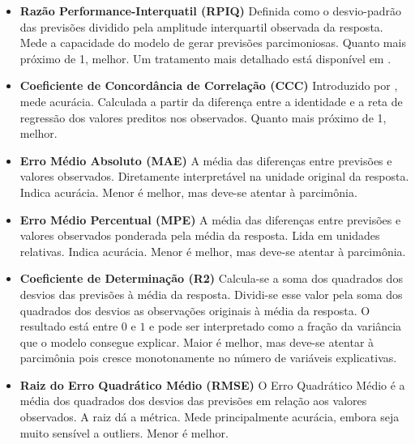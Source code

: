 \begin{itemize}
    \item \textbf{Razão Performance-Interquatil (RPIQ)} \newline
    Definida como o desvio-padrão das previsões dividido pela amplitude interquartil observada da resposta. Mede a capacidade do modelo de gerar previsões parcimoniosas. Quanto mais próximo de 1, melhor. Um tratamento mais detalhado está disponível em .
    
    \item \textbf{Coeficiente de Concordância de Correlação (CCC)} \newline
    Introduzido por , mede acurácia. Calculada a partir da diferença entre a identidade e a reta de regressão dos valores preditos nos observados. Quanto mais próximo de 1, melhor.
    
    \item \textbf{Erro Médio Absoluto (MAE)} \newline
    A média das diferenças entre previsões e valores observados. Diretamente interpretável na unidade original da resposta. Indica acurácia. Menor é melhor, mas deve-se atentar à parcimônia.
    
    \item \textbf{Erro Médio Percentual (MPE)} \newline
    A média das diferenças entre previsões e valores observados ponderada pela média da resposta. Lida em unidades relativas. Indica acurácia. Menor é melhor, mas deve-se atentar à parcimônia.
    
    \item \textbf{Coeficiente de Determinação (R2)} \newline
    Calcula-se a soma dos quadrados dos desvios das previsões à média da resposta. Dividi-se esse valor pela soma dos quadrados dos desvios as observações originais à média da resposta. O resultado está entre $0$ e $1$ e pode ser interpretado como a fração da variância que o modelo consegue explicar. Maior é melhor, mas deve-se atentar à parcimônia pois cresce monotonamente no número de variáveis explicativas.
    
    \item \textbf{Raiz do Erro Quadrático Médio (RMSE)} \newline
    O Erro Quadrático Médio é a média dos quadrados dos desvios das previsões em relação aos valores observados. A raiz dá a métrica. Mede principalmente acurácia, embora seja muito sensível a outliers. Menor é melhor.
    
\end{itemize}

